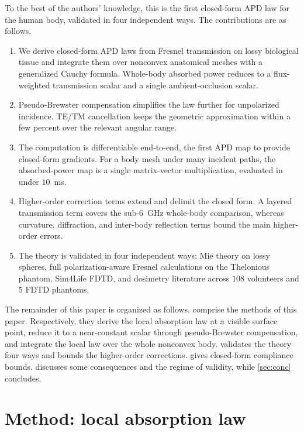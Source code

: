 \documentclass[journal,twocolumn,10pt]{IEEEtran}
\begin{document}
To the best of the authors' knowledge, this is the first closed-form
\gls{APD} law for the human body, validated in four independent ways. The
contributions are as follows.
\begin{enumerate}
  \item We derive closed-form \gls{APD} laws from Fresnel transmission
  on lossy biological tissue and integrate them over nonconvex
  anatomical meshes with a generalized Cauchy formula. Whole-body
  absorbed power reduces to a flux-weighted transmission scalar and a
  single ambient-occlusion scalar.

  \item Pseudo-Brewster compensation simplifies the law further for
  unpolarized incidence. \gls{TE}/\gls{TM} cancellation keeps the
  geometric approximation within a few percent over the relevant
  angular range.

  \item The computation is differentiable end-to-end, the first
  \gls{APD} map to provide closed-form gradients. For a body mesh
  under many incident paths, the absorbed-power map is a single
  matrix-vector multiplication, evaluated in under $10$~ms.

  \item Higher-order correction terms extend and delimit the closed
  form. A layered transmission term covers the sub-6~GHz whole-body
  comparison, whereas curvature, diffraction, and inter-body reflection
  terms bound the main higher-order errors.

  \item The theory is validated in four independent ways: Mie theory
  on lossy spheres, full polarization-aware Fresnel calculations on
  the Thelonious phantom, Sim4Life FDTD, and dosimetry literature
  across $108$ volunteers and $5$ FDTD phantoms.
\end{enumerate}

The remainder of this paper is organized as follows.
 comprise the methods of this paper.
Respectively, they derive the local absorption law at a visible
surface point, reduce it to a near-constant scalar through
pseudo-Brewster compensation, and integrate the local law over the
whole nonconvex body.  validates the theory four ways
and bounds the higher-order corrections.  gives
closed-form compliance bounds.  discusses some
consequences and the regime of validity, while \cref{sec:conc}
concludes.

\section{Method: local absorption law}\label{sec:law}
\end{document}
